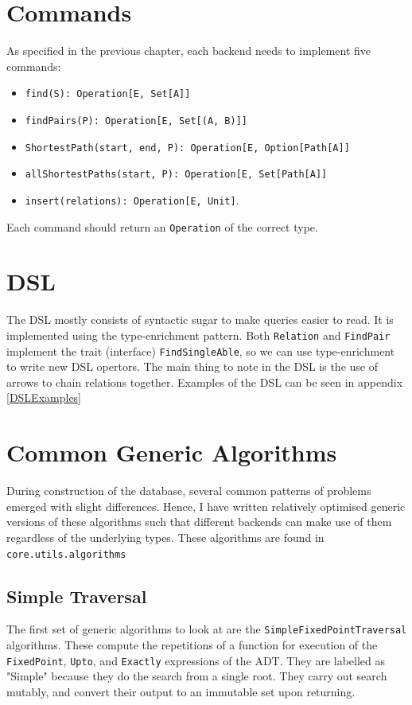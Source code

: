 \documentclass[12pt,a4paper,twoside,openright]{report}
\newcommand\codeName[1]{\texttt{#1}}
\begin{document}
\section{Commands}
As specified in the previous chapter, each backend needs to implement five commands: 
\begin{itemize}
\item \codeName{find(S): Operation[E, Set[A]]}
\item \codeName{findPairs(P): Operation[E, Set[(A, B)]]}
\item \codeName{ShortestPath(start, end, P): Operation[E, Option[Path[A]]}
\item \codeName{allShortestPaths(start, P): Operation[E, Set[Path[A]]}
\item \codeName{insert(relations): Operation[E, Unit]}.
\end{itemize}
Each command should return an \codeName{Operation} of the correct type.
\section{DSL}
The DSL mostly consists of syntactic sugar to make queries easier to read. It is implemented using the type-enrichment pattern. Both \codeName{Relation} and \codeName{FindPair} implement the trait (interface) \codeName{FindSingleAble}, so we can use type-enrichment to write new DSL opertors. The main thing to note in the DSL is the use of arrows to chain relations together. Examples of the DSL can be seen in appendix \ref{DSLExamples}

\section{Common Generic Algorithms}
During construction of the database, several common patterns of problems emerged with slight differences. Hence, I have written relatively optimised generic versions of these algorithms such that different backends can make use of them regardless of the underlying types. These algorithms are found in \codeName{core.utils.algorithms}


	\subsection{Simple Traversal}
	The first set of generic algorithms to look at are the \codeName{SimpleFixedPointTraversal} algorithms. These compute the repetitions of a function for execution of the \codeName{FixedPoint}, \codeName{Upto}, and \codeName{Exactly} expressions of the ADT. They are labelled as "Simple" because they do the search from a single root. They carry out search mutably, and convert their output to an immutable set upon returning.
	
\end{document}
